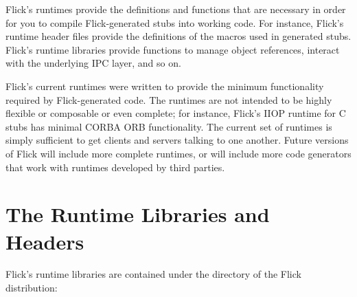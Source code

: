 

Flick's runtimes provide the definitions and functions that are necessary in
order for you to compile Flick-generated stubs into working code.  For
instance, Flick's runtime header files provide the definitions of the macros
used in generated stubs.  Flick's runtime libraries provide functions to manage
object references, interact with the underlying IPC layer, and so on.

Flick's current runtimes were written to provide the minimum functionality
required by Flick-generated code.  The runtimes are not intended to be highly
flexible or composable or even complete; for instance, Flick's IIOP runtime for
C stubs has minimal CORBA ORB functionality.  The current set of runtimes is
simply sufficient to get clients and servers talking to one another.  Future
versions of Flick will include more complete runtimes, or will include more
code generators that work with runtimes developed by third parties.



\section{The Runtime Libraries and Headers}
\label{sec:The Runtime Libraries and Headers}

Flick's runtime libraries are contained under the 
directory of the Flick distribution:

